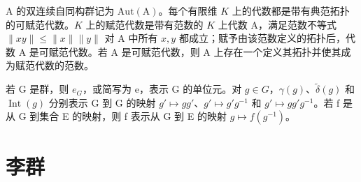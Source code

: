A 的双连续自同构群记为 \(\mathrm{Aut(A)}\)。每个有限维 \(K\) 上的代数都是带有典范拓扑的可赋范代数。\(K\) 上的赋范代数是带有范数的 \(K\) 上代数 A，满足范数不等式 \(\| xy\| \leqslant \| x\|\| y\|\) 对 A 中所有 \(x,y\) 都成立；赋予由该范数定义的拓扑后，代数 A 是可赋范代数。若 A 是可赋范代数，则 A 上存在一个定义其拓扑并使其成为赋范代数的范数。

若 G 是群，则 \(e_{G}\)，或简写为 e，表示 G 的单位元。对 \(g \in G\)，\(\gamma(g)\)、\(\tilde{\delta}(g)\) 和 \(\operatorname{Int}(g)\) 分别表示 G 到 G 的映射 \(g' \mapsto gg'\)、\(g' \mapsto g'g^{-1}\) 和 \(g' \mapsto gg'g^{-1}\)。若 f 是从 G 到集合 E 的映射，则 f 表示从 G 到 E 的映射 \(g \mapsto f(g^{-1})\)。

\section{李群}
